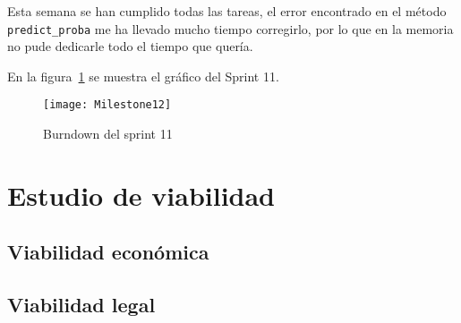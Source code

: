 Esta semana se han cumplido todas las tareas, el error encontrado en el método \texttt{predict\_proba} me ha llevado mucho tiempo corregirlo, por lo que en la memoria no pude dedicarle todo el tiempo que quería.

En la figura~\ref{fig:Milestone12} se muestra el gráfico del Sprint 11.

\begin{figure}
\centering
\texttt{[image: Milestone12]}
\caption{Burndown del sprint 11}
\label{fig:Milestone12}
\end{figure}

\section{Estudio de viabilidad}

\subsection{Viabilidad económica}

\subsection{Viabilidad legal}


